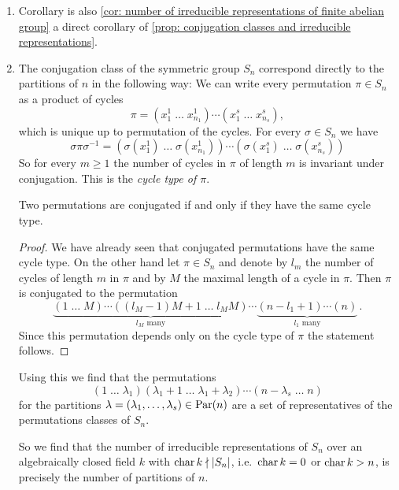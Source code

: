 \begin{expls}
  \begin{enumerate}[label=\emph{\alph*)}, leftmargin=*]
    \item
      Corollary is also \ref{cor: number of irreducible representations of finite abelian group} a direct corollary of \ref{prop: conjugation classes and irreducible representations}.
    \item
      The conjugation class of the symmetric group $S_n$ correspond directly to the partitions of $n$ in the following way:
      We can write every permutation $\pi \in S_n$ as a product of cycles
      \[
          \pi
        =         \left( x^1_1 \; \dots \; x^1_{n_1} \right)
          \dotsm  \left(x^s_1 \; \dots \; x^s_{n_s} \right),
      \]
      which is unique up to permutation of the cycles. For every $\sigma \in S_n$ we have
      \[
          \sigma \pi \sigma^{-1}
        =         \left(
                        \sigma\left( x^1_1 \right)
                    \;  \dotso
                    \;  \sigma\left( x^1_{n_1} \right)
                  \right)
          \dotsm  \left(
                        \sigma\left( x^s_1 \right)
                    \;  \dotso
                    \;  \sigma\left( x^s_{n_s} \right)
                  \right)
      \]
      So for every $m \geq 1$ the number of cycles in $\pi$ of length $m$ is invariant under conjugation.
      This is the \emph{cycle type of $\pi$}.
      
      \begin{claim}
        Two permutations are conjugated if and only if they have the same cycle type.
      \end{claim}
      \begin{proof}
        We have already seen that conjugated permutations have the same cycle type.
        On the other hand let $\pi \in S_n$ and denote by $l_m$ the number of cycles of length $m$ in $\pi$ and by $M$ the maximal length of a cycle in $\pi$.
        Then $\pi$ is conjugated to the permutation
        \[
                  \underbrace{ (1 \; \dots \; M) \dotsm ((l_M-1)M+1 \; \dots \; l_M M) }_{ \text{$l_M$ many} }
          \dotsm  \underbrace{ (n-l_1+1) \dotsm (n) }_{ \text{$l_1$ many} } \,.
        \]
        Since this permutation depends only on the cycle type of $\pi$ the statement follows.
      \end{proof}
      
      Using this we find that the permutations
      \[
                (1 \; \dotso \; \lambda_1)
                (\lambda_1 + 1 \; \dotso \; \lambda_1 + \lambda_2)
        \dotsm  (n-\lambda_s \; \dots \; n)
      \]
      for the partitions $\lambda = (\lambda_1, \dotsc, \lambda_s) \in \operatorname{Par}(n)$ are a set of representatives of the permutations classes of $S_n$.
      
      So we find that the number of irreducible representations of $S_n$ over an algebraically closed field $k$ with $\operatorname{char} k \nmid |S_n|$, i.e.\ $\operatorname{char} k = 0$ or $\operatorname{char} k > n$, is precisely the number of partitions of $n$.
  \end{enumerate}
\end{expls}



